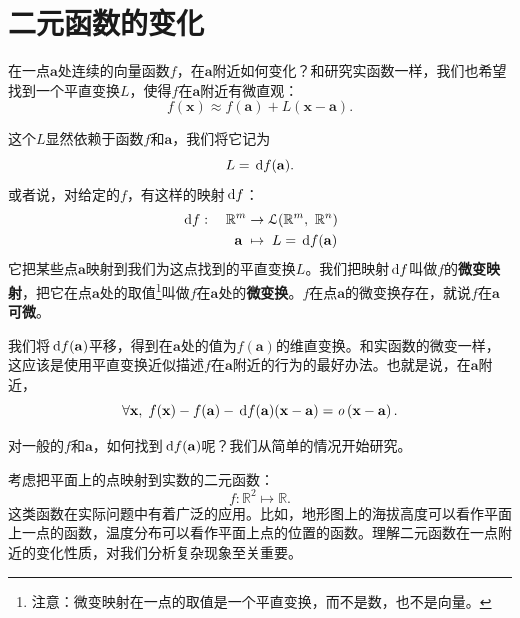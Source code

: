 \documentclass[12pt,UTF8]{ctexbook}
\begin{document}
\section{二元函数的变化}

在一点$\mathbf{a}$处连续的向量函数$f$，在$\mathbf{a}$附近如何变化？和研究实函数一样，我们也希望找到一个平直变换$L$，使得$f$在$\mathbf{a}$附近有微直观：
$$ f(\mathbf{x}) \approx f(\mathbf{a}) + L (\mathbf{x} - \mathbf{a}). $$

这个$L$显然依赖于函数$f$和$\mathbf{a}$，我们将它记为
$$ L = \,\mathrm{d} f (\mathbf{a}). $$
或者说，对给定的$f$，有这样的映射$\,\mathrm{d} f$：
\begin{align*}
    \,\mathrm{d} f:\quad \mathbb{R}^m &\rightarrow \mathcal{L}(\mathbb{R}^m, \,\,\mathbb{R}^n) \\
    \mathbf{a}\; &\mapsto \; L = \,\mathrm{d} f (\mathbf{a})
\end{align*}
它把某些点$\mathbf{a}$映射到我们为这点找到的平直变换$L$。我们把映射$\,\mathrm{d} f$叫做$f$的\textbf{微变映射}，把它在点$\mathbf{a}$处的取值\footnote{注意：微变映射在一点的取值是一个平直变换，而不是数，也不是向量。}叫做$f$在$\mathbf{a}$处的\textbf{微变换}。$f$在点$\mathbf{a}$的微变换存在，就说$f$在$\mathbf{a}$\textbf{可微}。

我们将$\,\mathrm{d} f (\mathbf{a})$平移，得到在$\mathbf{a}$处的值为$f(\mathbf{a})$的维直变换。和实函数的微变一样，这应该是使用平直变换近似描述$f$在$\mathbf{a}$附近的行为的最好办法。也就是说，在$\mathbf{a}$附近，
$$ \forall \mathbf{x}, \; f(\mathbf{x}) - f(\mathbf{a}) - \,\mathrm{d} f (\mathbf{a})(\mathbf{x} - \mathbf{a}) = \mathit{o}\left(\mathbf{x} - \mathbf{a}\right). $$

对一般的$f$和$\mathbf{a}$，如何找到$\,\mathrm{d} f (\mathbf{a})$呢？我们从简单的情况开始研究。

考虑把平面上的点映射到实数的二元函数：
$$ f : \mathbb{R}^2 \mapsto \mathbb{R}.$$
这类函数在实际问题中有着广泛的应用。比如，地形图上的海拔高度可以看作平面上一点的函数，温度分布可以看作平面上点的位置的函数。理解二元函数在一点附近的变化性质，对我们分析复杂现象至关重要。
\end{document}
